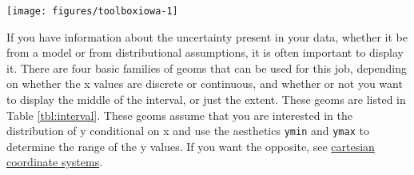 \begin{Shaded}
\end{Shaded}

\begin{flushleft}\texttt{[image: figures/toolboxiowa-1]} \end{flushleft}


If you have information about the uncertainty present in your data,
whether it be from a model or from distributional assumptions, it is
often important to display it. There are four basic families of geoms
that can be used for this job, depending on whether the x values are
discrete or continuous, and whether or not you want to display the
middle of the interval, or just the extent. These geoms are listed in
Table \ref{tbl:interval}. These geoms assume that you are interested in
the distribution of y conditional on x and use the aesthetics
\texttt{ymin} and \texttt{ymax} to determine the range of the y values.
If you want the opposite, see \hyperref[sub:cartesian]{cartesian
coordinate systems}.  
  
  

